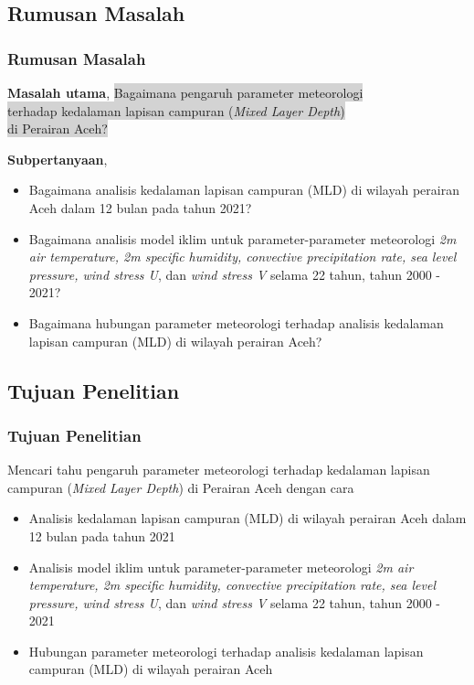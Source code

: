 \documentclass{beamer}
\begin{document}
\subsection{Rumusan Masalah}
\begin{frame}
	\frametitle{Rumusan Masalah}
	\textbf{Masalah utama},
	\colorbox{lightgray}{Bagaimana pengaruh parameter meteorologi}\\  \colorbox{lightgray}{terhadap kedalaman lapisan campuran (\textit{Mixed Layer Depth})} \\
	\colorbox{lightgray}{di Perairan Aceh?} 
	
	\textbf{Subpertanyaan},
	\begin{itemize}
		\item {\small Bagaimana analisis kedalaman lapisan campuran (MLD) di wilayah perairan Aceh dalam 12 bulan pada tahun 2021?} 
		\item {\small Bagaimana analisis model iklim untuk parameter-parameter meteorologi \textit{2m air temperature, 2m specific humidity, convective precipitation rate, sea level pressure, wind stress U}, dan \textit{wind stress V} selama 22 tahun, tahun 2000 - 2021?}
		\item {\small Bagaimana hubungan parameter meteorologi terhadap analisis kedalaman lapisan campuran (MLD) di wilayah perairan Aceh?}
	\end{itemize}
\end{frame}

\subsection{Tujuan Penelitian}
\begin{frame}
\frametitle{Tujuan Penelitian}
	Mencari tahu pengaruh parameter meteorologi terhadap kedalaman lapisan campuran (\textit{Mixed Layer Depth}) di Perairan Aceh dengan cara

	\begin{itemize}
		\item {\small Analisis kedalaman lapisan campuran (MLD) di wilayah perairan Aceh dalam 12 bulan pada tahun 2021} 
		\item {\small Analisis model iklim untuk parameter-parameter meteorologi \textit{2m air temperature, 2m specific humidity, convective precipitation rate, sea level pressure, wind stress U}, dan \textit{wind stress V} selama 22 tahun, tahun 2000 - 2021}
		\item {\small Hubungan parameter meteorologi terhadap analisis kedalaman lapisan campuran (MLD) di wilayah perairan Aceh}
	\end{itemize}
\end{frame}
\end{document}
